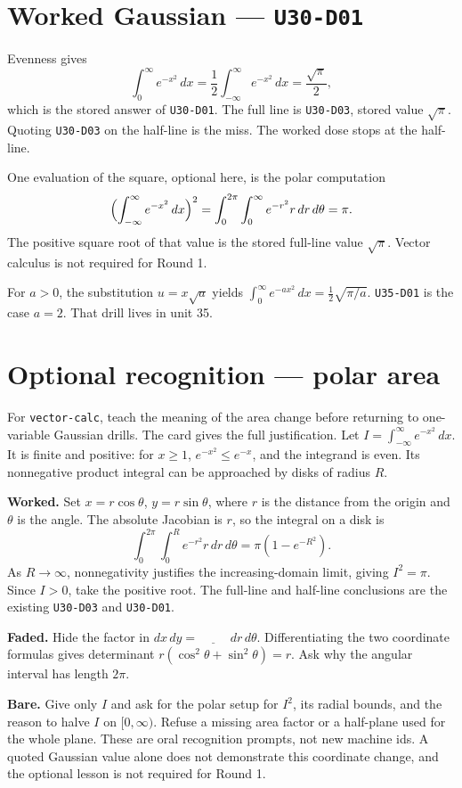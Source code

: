 \section{Worked Gaussian --- \texttt{U30-D01}}
Evenness gives
\[
\int_0^{\infty}e^{-x^2}\,dx=\frac12\int_{-\infty}^{\infty}e^{-x^2}\,dx=\frac{\sqrt{\pi}}{2},
\]
which is the stored answer of \texttt{U30-D01}. The full line is \texttt{U30-D03}, stored value $\sqrt{\pi}$. Quoting \texttt{U30-D03} on the half-line is the miss. The worked dose stops at the half-line.

One evaluation of the square, optional here, is the polar computation
\[
\Bigl(\int_{-\infty}^{\infty}e^{-x^2}\,dx\Bigr)^2=\int_0^{2\pi}\int_0^{\infty}e^{-r^2}r\,dr\,d\theta=\pi.
\]
The positive square root of that value is the stored full-line value $\sqrt{\pi}$. Vector calculus is not required for Round 1.

For $a>0$, the substitution $u=x\sqrt{a}$ yields $\int_0^{\infty}e^{-a x^2}\,dx=\frac12\sqrt{\pi/a}$. \texttt{U35-D01} is the case $a=2$. That drill lives in unit 35.

\section{Optional recognition --- polar area}
For \texttt{vector-calc}, teach the meaning of the area change before returning to one-variable Gaussian drills. The card gives the full justification. Let $I=\int_{-\infty}^{\infty}e^{-x^2}\,dx$. It is finite and positive: for $x\geq1$, $e^{-x^2}\leq e^{-x}$, and the integrand is even. Its nonnegative product integral can be approached by disks of radius $R$.

\textbf{Worked.} Set $x=r\cos\theta$, $y=r\sin\theta$, where $r$ is the distance from the origin and $\theta$ is the angle. The absolute Jacobian is $r$, so the integral on a disk is
\[
\int_0^{2\pi}\int_0^R e^{-r^2}r\,dr\,d\theta
=\pi(1-e^{-R^2}).
\]
As $R\to\infty$, nonnegativity justifies the increasing-domain limit, giving $I^2=\pi$. Since $I>0$, take the positive root. The full-line and half-line conclusions are the existing \texttt{U30-D03} and \texttt{U30-D01}.

\textbf{Faded.} Hide the factor in $dx\,dy=\underline{\hspace{1cm}}\,dr\,d\theta$. Differentiating the two coordinate formulas gives determinant $r(\cos^2\theta+\sin^2\theta)=r$. Ask why the angular interval has length $2\pi$.

\textbf{Bare.} Give only $I$ and ask for the polar setup for $I^2$, its radial bounds, and the reason to halve $I$ on $[0,\infty)$. Refuse a missing area factor or a half-plane used for the whole plane. These are oral recognition prompts, not new machine ids. A quoted Gaussian value alone does not demonstrate this coordinate change, and the optional lesson is not required for Round 1.

